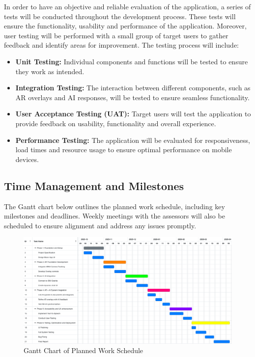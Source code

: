 \documentclass[12pt]{article}
\begin{document}
    In order to have an objective and reliable evaluation of the application, a series of tests will be conducted throughout the development process. These tests will ensure the functionality, usability and performance of the application. Moreover, user testing will be performed with a
    small group of target users to gather feedback and identify areas for improvement. The testing process will include:
        \begin{itemize}
            \item \textbf{Unit Testing:} Individual components and functions will be tested to ensure they work as intended.
            \item \textbf{Integration Testing:} The interaction between different components, such as AR overlays and AI responses, will be tested to ensure seamless functionality.
            \item \textbf{User Acceptance Testing (UAT):} Target users will test the application to provide feedback on usability, functionality and overall experience.
            \item \textbf{Performance Testing:} The application will be evaluated for responsiveness, load times and resource usage to ensure optimal performance on mobile devices.
        \end{itemize}

    \subsection{Time Management and Milestones}
        The Gantt chart below outlines the planned work schedule, including key milestones and deadlines. Weekly meetings with the assessors will also be scheduled to ensure alignment and address any issues promptly. 
        \begin{figure}[H]
        \centering
        \includegraphics[width=\textwidth]{img/GanttChart.png}
        \caption{Gantt Chart of Planned Work Schedule}
        \label{fig:GanttChart}
        \end{figure}
\end{document}
